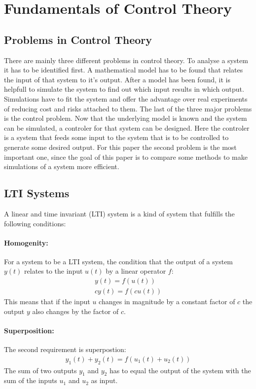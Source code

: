 \section{Fundamentals of Control Theory}

\subsection{Problems in Control Theory}
There are mainly three different problems in control theory.
To analyse a system it has to be identified first.
A mathematical model has to be found that relates the input of that system to it's output.
After a model has been found, it is helpfull to simulate the system to find out which input results in which output.
Simulations have to fit the system and offer the advantage over real experiments of reducing cost and risks attached to them.
The last of the three major problems is the control problem.
Now that the underlying model is known and the system can be simulated, a controler for that system can be designed.
Here the controler is a system that feeds some input to the system that is to be controlled to generate some desired output.
\cite{DouglasBa}
For this paper the second problem is the most important one, since the goal of this paper is to compare some methods to make simulations of a system more efficient.
\subsection{LTI Systems}
A linear and time invariant (LTI) system is a kind of system that fulfills the following conditions:
\paragraph{Homogenity:}
For a system to be a LTI system, the condition that the output of a system \(y(t)\) relates to the input \(u(t)\) by a linear operator \(f\):
\begin{gather}
y(t) = f(u(t)) \\
cy(t) = f(cu(t))
\end{gather}
This means that if the input \(u\) changes in magnitude by a constant factor of \(c\) the output \(y\) also changes by the factor of \(c\).
\paragraph{Superposition:}
The second requirement is superpostion:
\begin{gather}
y_1(t) + y_2(t) = f(u_1(t) + u_2(t))
\end{gather}
The sum of two outputs \(y_1\) and \(y_2\) has to equal the output of the system with the sum of the inputs \(u_1\) and \(u_2\) as input.
